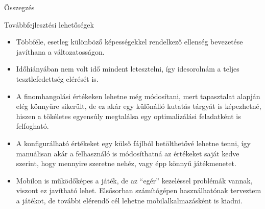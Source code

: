 \begin{MyChapter}{Összegzés}
\begin{MySection}{Továbbfejlesztési lehetőségek}
\begin{itemize}
			\item Többféle, esetleg különböző képességekkel rendelkező ellenség bevezetése javíthana a változatosságon.
			
			\item Időhiányában nem volt idő mindent letesztelni, így idesorolnám a teljes tesztlefedettség elérését is.
			
			\item A finomhangolási értékeken lehetne még módosítani, mert tapasztalat alapján elég könnyűre sikerült, de ez akár egy különálló kutatás tárgyát is képezhetné, hiszen a tökéletes egyensúly megtalálsa egy optimalizálási feladatként is felfogható.
			
			\item A konfigurálható értékeket egy külső fájlból betölthetővé lehetne tenni, így manuálisan akár a felhasználó is módosíthatná az értékeket saját kedve szerint, hogy mennyire szeretne nehéz, vagy épp könnyű játékmenetet.
			
			\item Mobilon is működőképes a játék, de az ``egér'' kezeléssel problémák vannak, viszont ez javítható lehet. Elsősorban számítógépen használhatónak terveztem a játékot, de további elérendő cél lehetne mobilalkalmazásként is kiadni.
		\end{itemize}
		
	\end{MySection}

\end{MyChapter}
